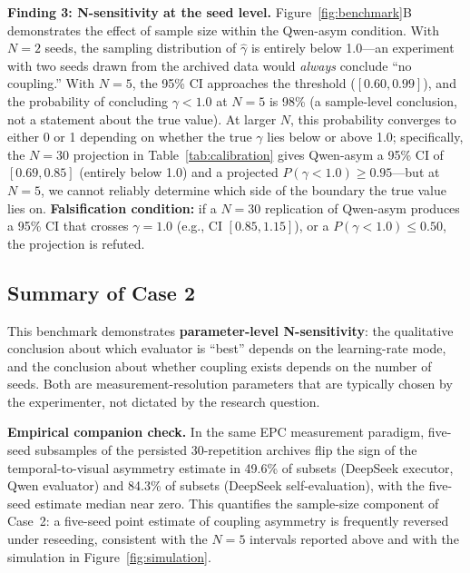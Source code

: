 \documentclass[11pt]{article}
\begin{document}
\textbf{Finding 3: N-sensitivity at the seed level.} Figure~\ref{fig:benchmark}B demonstrates the effect of sample size within the Qwen-asym condition. With $N{=}2$ seeds, the sampling distribution of $\hat{\gamma}$ is entirely below 1.0---an experiment with two seeds drawn from the archived data would \emph{always} conclude ``no coupling.'' With $N{=}5$, the 95\% CI approaches the threshold ($[0.60, 0.99]$), and the probability of concluding $\gamma < 1.0$ at $N{=}5$ is 98\% (a sample-level conclusion, not a statement about the true value). At larger $N$, this probability converges to either 0 or 1 depending on whether the true $\gamma$ lies below or above 1.0; specifically, the $N{=}30$ projection in Table~\ref{tab:calibration} gives Qwen-asym a 95\% CI of $[0.69, 0.85]$ (entirely below 1.0) and a projected $P(\gamma < 1.0) \geq 0.95$---but at $N{=}5$, we cannot reliably determine which side of the boundary the true value lies on. \textbf{Falsification condition:} if a $N{=}30$ replication of Qwen-asym produces a 95\% CI that crosses $\gamma{=}1.0$ (e.g., CI $[0.85, 1.15]$), or a $P(\gamma < 1.0) \leq 0.50$, the projection is refuted.

\subsection{Summary of Case 2}

This benchmark demonstrates \textbf{parameter-level N-sensitivity}: the qualitative conclusion about which evaluator is ``best'' depends on the learning-rate mode, and the conclusion about whether coupling exists depends on the number of seeds. Both are measurement-resolution parameters that are typically chosen by the experimenter, not dictated by the research question.

\textbf{Empirical companion check.} In the same EPC measurement paradigm, five-seed subsamples of the persisted 30-repetition archives flip the sign of the temporal-to-visual asymmetry estimate in 49.6\% of subsets (DeepSeek executor, Qwen evaluator) and 84.3\% of subsets (DeepSeek self-evaluation), with the five-seed estimate median near zero. This quantifies the sample-size component of Case~2: a five-seed point estimate of coupling asymmetry is frequently reversed under reseeding, consistent with the $N{=}5$ intervals reported above and with the simulation in Figure~\ref{fig:simulation}.
\end{document}
